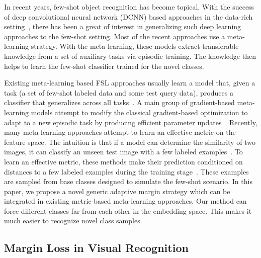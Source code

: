 \documentclass[10pt,twocolumn,letterpaper]{article}
\begin{document}
In recent years, few-shot object recognition has become topical. With the success of deep convolutional neural network (DCNN) based approaches in the data-rich setting~\cite{Russakovsky2015ImageNet,he2016cvpr,szegedy2015cvpr,donahue2014decaf}, there has been
a great of interest in generalizing such deep learning approaches to the few-shot setting. Most of the recent approaches use a meta-learning strategy. With the meta-learning, these models extract transferable knowledge from a set of auxiliary tasks via episodic training. The knowledge then helps  to learn the few-shot classifier trained for the novel classes. 

Existing meta-learning based FSL approaches usually learn a model that, given a task (a set of few-shot labeled data and some test query data), produces a classifier that generalizes across all tasks~\cite{Gidaris2018cvpr}. A main group of gradient-based meta-learning models attempt to modify the classical gradient-based optimization to adapt to a new episodic task by producing efficient parameter updates~\cite{Finn2017icml,Gidaris2018cvpr,Antoniou2018iclr,Ravi2017iclr}. Recently, many meta-learning approaches attempt to learn an effective metric on the feature space. The intuition is that if a model can determine the similarity of two images, it can classify an unseen test image with a few labeled examples~\cite{Snell2017nips,Sung2018cvpr}. To learn an effective metric, these methods make their prediction conditioned on distances to a few labeled examples during the training stage~\cite{Bertinetto2019iclr,vinyals2016bnips}. These examples are sampled from base classes designed to simulate the few-shot scenario. In this paper, we propose a novel generic adaptive margin strategy which can be integrated in existing metric-based meta-learning approaches. Our method can force different classes far from each other in the embedding space. This makes it much easier to recognize novel class samples. 

\subsection{Margin Loss in Visual Recognition}
\end{document}
